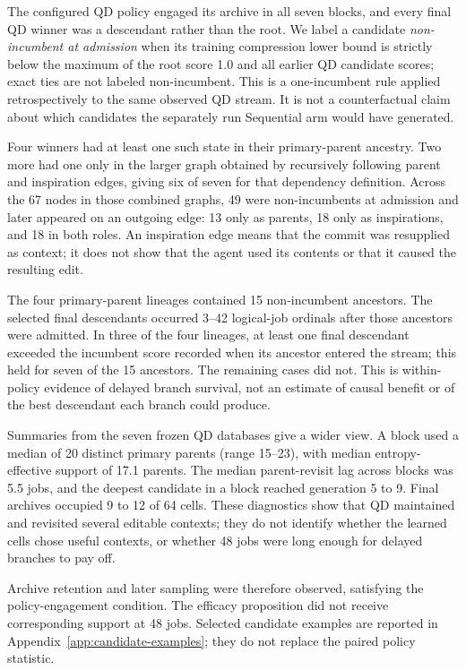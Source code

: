 \documentclass[10pt,twocolumn]{article}
\begin{document}
The configured QD policy engaged its archive in all seven blocks, and every
final QD winner was a descendant rather than the root. We label a candidate
\emph{non-incumbent at admission} when its training compression lower bound is
strictly below the maximum of the root score 1.0 and all earlier QD candidate
scores; exact ties are not labeled non-incumbent. This is a one-incumbent rule
applied retrospectively to the same observed QD stream. It is not a
counterfactual claim about which candidates the separately run Sequential arm
would have generated.

Four winners had at least one such state in their primary-parent ancestry. Two
more had one only in the larger graph obtained by recursively following parent
and inspiration edges, giving six of seven for that dependency definition.
Across the 67 nodes in those combined graphs, 49 were non-incumbents at
admission and later appeared on an outgoing edge: 13 only as parents, 18 only
as inspirations, and 18 in both roles. An inspiration edge means that the
commit was resupplied as context; it does not show that the agent used its
contents or that it caused the resulting edit.

The four primary-parent lineages contained 15 non-incumbent ancestors. The
selected final descendants occurred 3--42 logical-job ordinals after those
ancestors were admitted. In three of the four lineages, at least one final
descendant exceeded the incumbent score recorded when its ancestor entered the
stream; this held for seven of the 15 ancestors. The remaining cases did not.
This is within-policy evidence of delayed branch survival, not an estimate of
causal benefit or of the best descendant each branch could produce.

Summaries from the seven frozen QD databases give a wider view. A block
used a median of 20 distinct primary parents (range 15--23), with median
entropy-effective support of 17.1 parents. The median parent-revisit lag across
blocks was 5.5 jobs, and the deepest candidate in a block reached generation 5
to 9. Final archives occupied 9 to 12 of 64 cells. These diagnostics show that
QD maintained and revisited several editable contexts; they do not identify
whether the learned cells chose useful contexts, or whether 48 jobs were long
enough for delayed branches to pay off.

Archive retention and later sampling were therefore observed, satisfying the
policy-engagement condition. The efficacy proposition did not receive
corresponding support at 48 jobs. Selected candidate examples are reported in
Appendix~\ref{app:candidate-examples}; they do not replace the paired policy
statistic.
\end{document}
